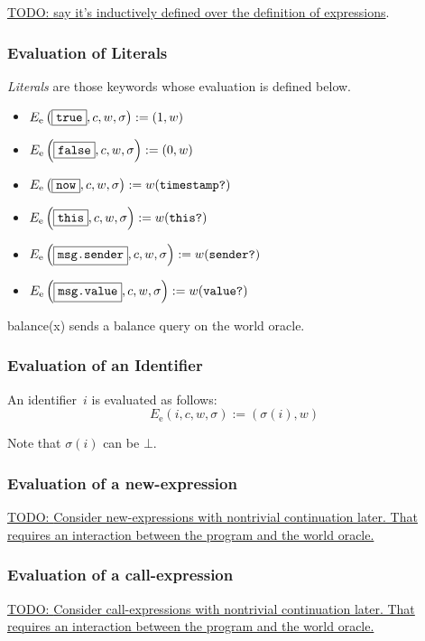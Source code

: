 \documentclass{book}
\newcommand{\todo}[1]{\underline{TODO: {#1}}}
\newcommand{\evalE}[1]{E_\mathrm{e}\left({#1}\right)}
\begin{document}
\todo{say it's inductively defined over the definition of expressions}.

\subsubsection{Evaluation of Literals}

\textit{Literals} are those keywords whose evaluation is defined below.

\begin{itemize}
  \item $\evalE{\boxed{\true}, c, w, \sigma} := (1, w)$
  \item $\evalE{\boxed{\false}, c, w, \sigma} := (0, w)$
  \item $\evalE{\boxed{\now}, c, w, \sigma} := w(\timestampQuery)$
  \item $\evalE{\boxed{\this}, c, w, \sigma} := w(\thisQuery)$
  \item $\evalE{\boxed{\msgsender}, c, w, \sigma} := w(\senderQuery)$
  \item $\evalE{\boxed{\msgvalue}, c, w, \sigma} := w(\valueQuery)$
\end{itemize}

balance(x) sends a balance query on the world oracle.

\subsubsection{Evaluation of an Identifier}

An identifier~$i$ is evaluated as follows:
\[
\evalE{\boxed{i}, c, w, \sigma} := (\sigma(i), w)
\]

Note that $\sigma(i)$ can be $\bot$.

\subsubsection{Evaluation of a new-expression}

\todo{Consider new-expressions with nontrivial continuation later.  That requires an interaction between the program and the world oracle. }

\subsubsection{Evaluation of a call-expression}

\todo{Consider call-expressions with nontrivial continuation later.  That requires an interaction between the program and the world oracle. }
\end{document}
